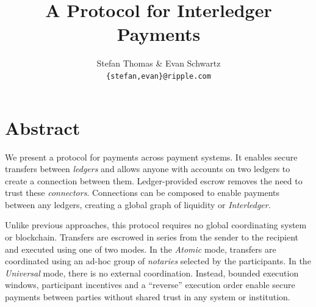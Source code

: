 \documentclass[letterpaper,twocolumn,10pt]{article}
\begin{document}
\date{}

\title{\Large \bf A Protocol for Interledger Payments}

\author{
\textnormal{Stefan Thomas \& Evan Schwartz} \\
\textnormal{\texttt{\{stefan,evan\}@ripple.com}}
}

\maketitle

\thispagestyle{empty}
\section*{Abstract}

We present a protocol for payments across payment systems. It enables secure transfers between \textit{ledgers} and allows anyone with accounts on two ledgers to create a connection between them. Ledger-provided escrow removes the need to trust these \textit{connectors}. Connections can be composed to enable payments between any ledgers, creating a global graph of liquidity or \mbox{\textit{Interledger}}.

Unlike previous approaches, this protocol requires no global coordinating system or blockchain. Transfers are escrowed in series from the sender to the recipient and executed using one of two modes. In the \textit{Atomic} mode, transfers are coordinated using an ad-hoc group of \textit{notaries} selected by the participants. In the \textit{Universal} mode, there is no external coordination. Instead, bounded execution windows, participant incentives and a \mbox{``reverse''} execution order enable secure payments between parties without shared trust in any system or institution.

\end{document}
